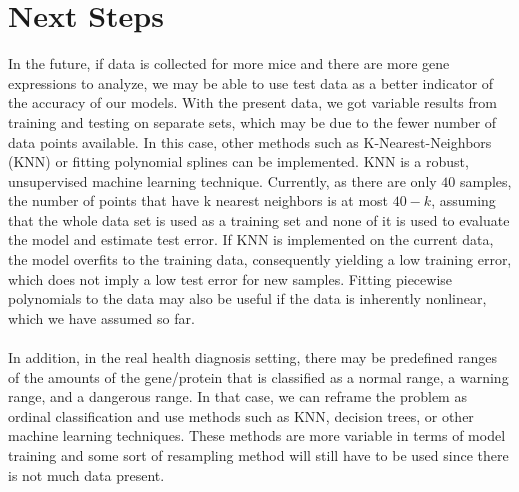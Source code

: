 \documentclass{article}
\begin{document}
\section{Next Steps}
In the future, if data is collected for more mice and there are more gene expressions to analyze, we may be able to use test data as a better indicator of the accuracy of our models. With the present data, we got variable results from training and testing on separate sets, which may be due to the fewer number of data points available. In this case, other methods such as K-Nearest-Neighbors (KNN) or fitting polynomial splines can be implemented. KNN is a robust, unsupervised machine learning technique.  Currently, as there are only $40$ samples, the number of points that have k nearest neighbors is at most $40-k$, assuming that the whole data set is used as a training set and none of it is used to evaluate the model and estimate test error.  If KNN is implemented on the current data, the model overfits to the training data, consequently yielding a low training error, which does not imply a low test error for new samples.  Fitting piecewise polynomials to the data may also be useful if the data is inherently nonlinear, which we have assumed so far.  \\
\null\\
In addition, in the real health diagnosis setting, there may be predefined ranges of the amounts of the gene/protein that is classified as a normal range, a warning range, and a dangerous range.  In that case, we can reframe the problem as ordinal classification and use methods such as KNN, decision trees, or other machine learning techniques.  These methods are more variable in terms of model training and some sort of resampling method will still have to be used since there is not much data present. 
\end{document}
